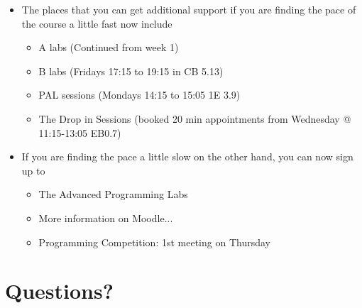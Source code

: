 \documentclass{beamer}
\begin{document}
\begin{frame} 
\begin{itemize}
\item The places that you can get additional support if you are finding the pace of the course a little fast now include
\begin{itemize}
\item A labs (Continued from week 1)
\item B labs (Fridays 17:15 to 19:15 in CB 5.13)
\item PAL sessions (Mondays 14:15 to 15:05 1E 3.9)
\item The Drop in Sessions (booked 20 min appointments from Wednesday @ 11:15-13:05 EB0.7)
\end{itemize}
\end{itemize}
\end{frame}

 \begin{frame} 
 \begin{itemize}
\item If you are finding the pace a little slow on the other hand, you can now sign up to
\begin{itemize}
\item The Advanced Programming Labs
\item More information on Moodle...
\bigskip
\item Programming Competition: 1st meeting on Thursday
\end{itemize}
\end{itemize}
 \end{frame}
 
 \section{Questions?}

\end{document}
